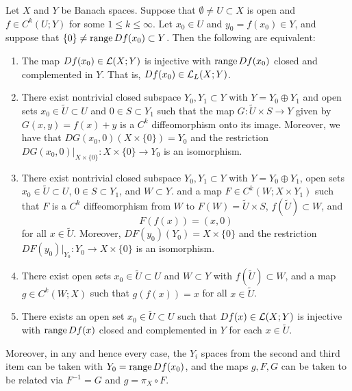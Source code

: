 \documentclass[a4paper]{article}
\begin{document}
\begin{thm}
  Let $X$ and $Y$ be Banach spaces. Suppose that $\emptyset \neq U
    \subset X$ is open and $f \in C^k(U; Y)$ for some $1 \leq k \leq
    \infty$. Let $x_0 \in U$ and $y_0 = f(x_0) \in Y$, and suppose
  that $\{0\} \neq \operatorname{range} Df(x_0) \subset Y$. Then the
  following are equivalent:
  \begin{enumerate}
    \item The map $Df(x_0) \in \mathcal{L}(X; Y)$ is injective with $\operatorname{range} Df(x_0)$
          closed and complemented in $Y$. That is, $Df(x_0) \in \mathcal{L}_L(X;
          Y)$.

    \item There exist nontrivial closed subspace $Y_0, Y_1 \subset Y$ with
          $Y = Y_0 \oplus Y_1$ and open sets $x_0 \in \tilde{U} \subset U$
          and $0 \in S \subset Y_1$ such that the map $G : \tilde{U}
          \times S \to Y$ given by $G(x, y) = f(x) + y$ is a $C^k$
          diffeomorphism onto its image. Moreover, we have that $DG(x_0,
          0) (X \times \{0\}) = Y_0$ and the restriction $DG(x_0, 0)
          \vert_{X \times \{0\}} : X \times \{0\} \to Y_0$ is an
          isomorphism.

    \item There exist nontrivial closed subspace $Y_0, Y_1 \subset Y$ with
          $Y = Y_0 \oplus Y_1$, open sets $x_0 \in \tilde{U} \subset U$,
          $0 \in S \subset Y_1$, and $W \subset Y$. and a map $F \in C^k(W
          ; X \times Y_1)$ such that $F$ is a $C^k$ diffeomorphism from
          $W$ to $F(W) = \tilde{U} \times S$, $f(\tilde{U}) \subset W$,
          and
          \[
            F(f(x)) = (x, 0)
          \]
          for all $x \in \tilde{U}$. Moreover, $DF(y_0) (Y_0) = X \times
          \{0\}$ and the restriction $DF(y_0) \vert_{Y_0} : Y_0 \to X
          \times \{0\}$ is an isomorphism.

    \item There exist open sets $x_0 \in \tilde{U} \subset U$ and $W
          \subset Y$ with $f(\tilde{U}) \subset W$, and a map $g \in C^k(W
          ; X)$ such that $g(f(x)) = x$ for all $x \in \tilde{U}$.

    \item There exists an open set $x_0 \in \tilde{U} \subset U$ such that
          $Df(x) \in \mathcal{L}(X; Y)$ is injective with $\operatorname{range} Df(x)$ closed and
          complemented in $Y$ for each $x \in \tilde{U}$.
  \end{enumerate}

  Moreover, in any and hence every case, the $Y_i$ spaces from the second
  and third item can be taken with $Y_0 = \operatorname{range} Df(x_0)$, and the maps $g,
  F, G$ can be taken to be related via $F^{-1} = G$ and $g = \pi_X \circ
  F$.
\end{thm}
\end{document}
